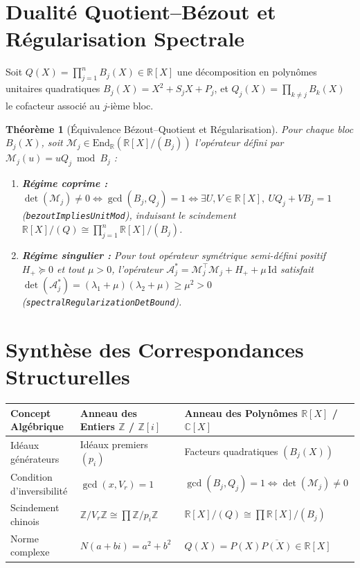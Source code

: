 \documentclass[11pt,a4paper]{article}
\newtheorem{theorem}{Théorème}[section]
\begin{document}
\section{Dualité Quotient--Bézout et Régularisation Spectrale}

Soit $Q(X) = \prod_{j=1}^n B_j(X) \in \mathbb{R}[X]$ une décomposition en polynômes unitaires quadratiques $B_j(X) = X^2 + S_j X + P_j$, et $Q_j(X) = \prod_{k \neq j} B_k(X)$ le cofacteur associé au $j$-ième bloc.

\begin{theorem}[Équivalence Bézout--Quotient et Régularisation]
Pour chaque bloc $B_j(X)$, soit $\mathcal{M}_j \in \mathrm{End}_{\mathbb{R}}(\mathbb{R}[X]/(B_j))$ l'opérateur défini par $\mathcal{M}_j(u) = u Q_j \bmod B_j$ :
\begin{enumerate}
    \item \textbf{Régime coprime :} $\det(\mathcal{M}_j) \neq 0 \iff \gcd(B_j, Q_j) = 1 \iff \exists U, V \in \mathbb{R}[X],\ U Q_j + V B_j = 1$ (\texttt{bezoutImpliesUnitMod}), induisant le scindement $\mathbb{R}[X]/(Q) \cong \prod_{j=1}^n \mathbb{R}[X]/(B_j)$.
    \item \textbf{Régime singulier :} Pour tout opérateur symétrique semi-défini positif $H_+ \succeq 0$ et tout $\mu > 0$, l'opérateur $\mathcal{A}_j^* = \mathcal{M}_j^\top \mathcal{M}_j + H_+ + \mu\,\mathrm{Id}$ satisfait $\det(\mathcal{A}_j^*) = (\lambda_1 + \mu)(\lambda_2 + \mu) \ge \mu^2 > 0$ (\texttt{spectralRegularizationDetBound}).
\end{enumerate}
\end{theorem}

\section{Synthèse des Correspondances Structurelles}

\begin{table}[h]
\centering
\small
\begin{tabular}{p{3.8cm} p{4.8cm} p{5.2cm}}
\toprule
\textbf{Concept Algébrique} & \textbf{Anneau des Entiers $\mathbb{Z}$ / $\mathbb{Z}[i]$} & \textbf{Anneau des Polynômes $\mathbb{R}[X]$ / $\mathbb{C}[X]$} \\
\midrule
Idéaux générateurs & Idéaux premiers $(p_i)$ & Facteurs quadratiques $(B_j(X))$ \\
Condition d'inversibilité & $\gcd(x, V_r) = 1$ & $\gcd(B_j, Q_j) = 1 \iff \det(\mathcal{M}_j) \neq 0$ \\
Scindement chinois & $\mathbb{Z}/V_r\mathbb{Z} \cong \prod \mathbb{Z}/p_i\mathbb{Z}$ & $\mathbb{R}[X]/(Q) \cong \prod \mathbb{R}[X]/(B_j)$ \\
Norme complexe & $N(a+bi) = a^2 + b^2$ & $Q(X) = P(X)\overline{P(X)} \in \mathbb{R}[X]$ \\
\bottomrule
\end{tabular}
\end{table}
\end{document}
